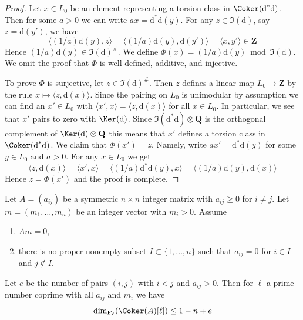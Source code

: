 \begin{proof}
Let $x \in L_0$ be an element representing a torsion
class in $\Coker(\text{d}^*\text{d})$.
Then for some $a > 0$ we can write $ax = \text{d}^*\text{d}(y)$.
For any $z \in \Im(\text{d})$, say $z = \text{d}(y')$, we have
$$
\langle (1/a)\text{d}(y), z \rangle =
\langle (1/a)\text{d}(y), \text{d}(y') \rangle =
\langle x, y' \rangle \in \mathbf{Z}
$$
Hence $(1/a)\text{d}(y) \in \Im(\text{d})^\#$. We define
$\Phi(x) = (1/a)\text{d}(y) \bmod \Im(\text{d})$.
We omit the proof that $\Phi$ is well defined, additive, and injective.

\medskip\noindent
To prove $\Phi$ is surjective, let $z \in \Im(\text{d})^\#$.
Then $z$ defines a linear map $L_0 \to \mathbf{Z}$
by the rule $x \mapsto \langle z, \text{d}(x)\rangle$.
Since the pairing on $L_0$ is unimodular by assumption
we can find an $x' \in L_0$ with
$\langle x', x \rangle = \langle z, \text{d}(x)\rangle$
for all $x \in L_0$. In particular, we see
that $x'$ pairs to zero with $\Ker(\text{d})$.
Since $\Im(\text{d}^*\text{d}) \otimes \mathbf{Q}$
is the orthogonal complement of $\Ker(\text{d}) \otimes \mathbf{Q}$
this means that $x'$ defines a torsion class in
$\Coker(\text{d}^*\text{d})$. We claim that $\Phi(x') = z$.
Namely, write $a x' = \text{d}^*\text{d}(y)$
for some $y \in L_0$ and $a > 0$.
For any $x \in L_0$ we get
$$
\langle z, \text{d}(x)\rangle =
\langle x', x \rangle =
\langle (1/a)\text{d}^*\text{d}(y), x \rangle =
\langle (1/a)\text{d}(y),\text{d}(x) \rangle
$$
Hence $z = \Phi(x')$ and the proof is complete.
\end{proof}

\begin{lemma}
\label{lemma-recurring-symmetric-integer}
Let $A = (a_{ij})$ be a symmetric $n \times n$ integer matrix with
$a_{ij} \geq 0$ for $i \not = j$. Let $m = (m_1, \ldots, m_n)$ be an
integer vector with $m_i > 0$. Assume
\begin{enumerate}
\item $Am = 0$,
\item there is no proper nonempty subset $I \subset \{1, \ldots, n\}$
such that $a_{ij} = 0$ for $i \in I$ and $j \not \in I$.
\end{enumerate}
Let $e$ be the number of pairs $(i, j)$ with $i < j$ and $a_{ij} > 0$.
Then for $\ell$ a prime number coprime with all $a_{ij}$ and $m_i$
we have
$$
\dim_{\mathbf{F}_\ell}(\Coker(A)[\ell]) \leq 1 - n + e
$$
\end{lemma}

